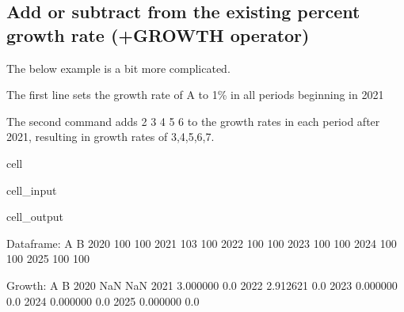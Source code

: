 \documentclass[letterpaper,10pt,english]{jupyterBook}
\begin{document}
\subsection{Add or subtract from the existing percent growth rate (+GROWTH operator)}
\label{\detokenize{content/04_PythonEssentials/UpdateCommand:add-or-subtract-from-the-existing-percent-growth-rate-growth-operator}}
\sphinxAtStartPar
The below example is a bit more complicated.

\sphinxAtStartPar
The first line sets the growth rate of A to 1\% in all periods beginning in  2021

\sphinxAtStartPar
The second command adds 2 3 4 5 6 to the growth rates in each period after 2021, resulting in growth rates of 3,4,5,6,7.

\begin{sphinxuseclass}{cell}\begin{sphinxVerbatimInput}

\begin{sphinxuseclass}{cell_input}
\begin{sphinxVerbatim}[commandchars=\\\{\}]
 
\end{sphinxVerbatim}

\end{sphinxuseclass}\end{sphinxVerbatimInput}
\begin{sphinxVerbatimOutput}

\begin{sphinxuseclass}{cell_output}
\begin{sphinxVerbatim}[commandchars=\\\{\}]
Dataframe:
        A    B
2020  100  100
2021  103  100
2022  100  100
2023  100  100
2024  100  100
2025  100  100

Growth:
             A    B
2020       NaN  NaN
2021  3.000000  0.0
2022 \PYGZhy{}2.912621  0.0
2023  0.000000  0.0
2024  0.000000  0.0
2025  0.000000  0.0
\end{sphinxVerbatim}

\end{sphinxuseclass}\end{sphinxVerbatimOutput}

\end{sphinxuseclass}
\end{document}
